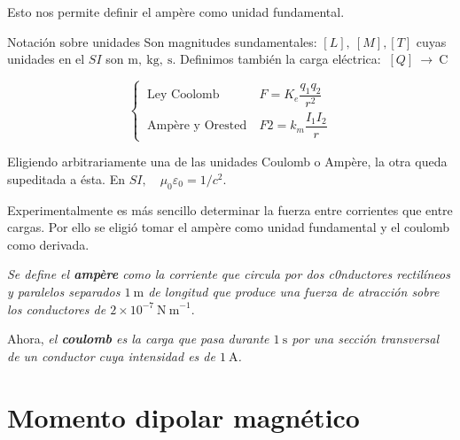 Esto nos permite definir el ampère como unidad fundamental.



\begin{myexampleblock}{Notación sobre unidades}
	Son magnitudes sundamentales: $[L],\ [M], [T]$ cuyas unidades en el $SI$ son $\mathrm{m},\ \mathrm{kg},\ \mathrm{s}$.
	Definimos también la carga eléctrica: $\ [Q] \ \to \ \mathrm{C}$
	
 	$$\begin{cases}
\ \text{Ley Coolomb} \quad & 	\ F=K_e \dfrac{q_1q_2}{r^2}\\
\ \text{Ampère y Orested} & \ F2=k_m \dfrac{I_1 I_2}{r} 
\end{cases}
 $$
 
\vspace{2mm} Eligiendo arbitrariamente una de las unidades Coulomb o Ampère, la otra queda supeditada a ésta. En $SI,\quad \mu_0\varepsilon_0=1/c^2$.
 
\vspace{2mm} Experimentalmente es más sencillo determinar la fuerza entre corrientes que entre cargas. Por ello se eligió tomar el ampère como unidad fundamental y el coulomb como derivada.
 
\vspace{2mm} \emph{Se define el \textbf{ampère} como la corriente que circula por dos c0nductores rectilíneos y paralelos separados $1\ \mathrm{m}$ de longitud que produce una fuerza de atracción sobre los conductores de $2\times 10^{-7} \ \mathrm{N\ m}^{-1}$}.
 
\vspace{2mm} Ahora, \emph{el \textbf{coulomb} es la carga que pasa durante $1\ \mathrm{s}$ por una sección transversal de un conductor cuya intensidad es de $1\ \mathrm{A}$.}
\end{myexampleblock} 



\section{Momento dipolar magnético}

